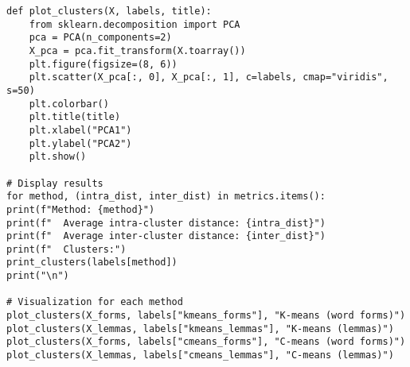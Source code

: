 \begin{lstlisting}[label=lst:1,caption= Сравнение алгоритмов кластеризации K-Means и K-Medoids]
def plot_clusters(X, labels, title):
	from sklearn.decomposition import PCA
	pca = PCA(n_components=2)
	X_pca = pca.fit_transform(X.toarray())
	plt.figure(figsize=(8, 6))
	plt.scatter(X_pca[:, 0], X_pca[:, 1], c=labels, cmap="viridis", s=50)
	plt.colorbar()
	plt.title(title)
	plt.xlabel("PCA1")
	plt.ylabel("PCA2")
	plt.show()

# Display results
for method, (intra_dist, inter_dist) in metrics.items():
print(f"Method: {method}")
print(f"  Average intra-cluster distance: {intra_dist}")
print(f"  Average inter-cluster distance: {inter_dist}")
print(f"  Clusters:")
print_clusters(labels[method])
print("\n")

# Visualization for each method
plot_clusters(X_forms, labels["kmeans_forms"], "K-means (word forms)")
plot_clusters(X_lemmas, labels["kmeans_lemmas"], "K-means (lemmas)")
plot_clusters(X_forms, labels["cmeans_forms"], "C-means (word forms)")
plot_clusters(X_lemmas, labels["cmeans_lemmas"], "C-means (lemmas)")
\end{lstlisting}

\clearpage
